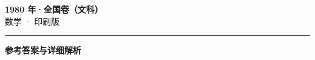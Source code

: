 \documentclass[zihao=5, a4paper]{ctexart}
\begin{document}
\begin{center}
  {\Large\bfseries 1980 年·全国卷（文科）}\\[4pt]
  {\large 数学 · 印刷版}
\end{center}
\medskip
{}

\par\bigskip\hrule\bigskip
{}
\begin{center}{\large\bfseries 参考答案与详细解析}\end{center}
\smallskip

\end{document}
